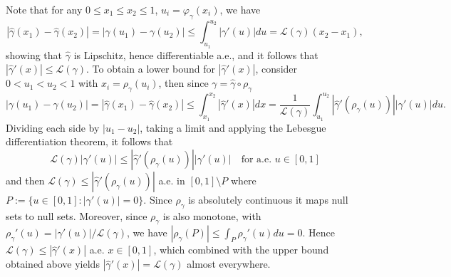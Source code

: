 \documentclass[a4paper,11pt]{amsart}
\theoremstyle{definition}\newtheorem*{definition}{Definition}
\theoremstyle{definition} \newtheorem{proposition}[theorem]{Proposition}
\theoremstyle{definition}\newtheorem{lemma}[theorem]{Lemma}
\theoremstyle{definition}\newtheorem{corollary}[theorem]{Corollary}
\theoremstyle{definition}\newtheorem{example}{Example}
\theoremstyle{remark}\newtheorem*{remark}{Remark}
\newcommand{\abs}[1]{\left | {#1}\right |}
\def\length{\mathcal L}
\begin{document}
Note that for any $0\leq x_1\leq x_2\leq 1$, $u_i=\varphi_\gamma(x_i)$, we have
\begin{equation*}
\abs{\hat\gamma(x_1)-\hat\gamma(x_2)}=\abs{\gamma(u_1)-\gamma(u_2)}\leq \int_{u_1}^{u_2}\abs{\gamma'(u)}du=\length(\gamma)(x_2-x_1),
\end{equation*}
showing that $\hat\gamma$ is Lipschitz, hence differentiable a.e., and it follows that  $\abs{\hat\gamma'(x)}\leq \length(\gamma)$. To obtain a lower bound for $\abs{\hat\gamma'(x)}$, consider $0<u_1<u_2<1$ with $x_i=\rho_\gamma(u_i)$, then since $\gamma=\hat\gamma\circ \rho_\gamma$
\[
\abs{\gamma(u_1)-\gamma(u_2)}=\abs{\hat\gamma(x_1)-\hat\gamma(x_2)}\leq \int_{x_1}^{x_2}\abs{\hat\gamma'(x)}dx=\frac{1}{\length(\gamma)}\int_{u_1}^{u_2}\abs{\hat\gamma'(\rho_\gamma(u))}\abs{\gamma'(u)}du.
\]
Dividing each side by $|u_1-u_2|$, taking a limit and applying the Lebesgue differentiation theorem, it follows that 
\[
\length(\gamma) \abs{\gamma'(u)}\leq \abs{\hat \gamma'(\rho_\gamma(u))}\abs{\gamma'(u)} \quad \text{for a.e. } u\in[0,1]
\]
and then $\length(\gamma) \leq \abs{\hat\gamma'(\rho_\gamma(u))}$ a.e. in $[0,1]\setminus P$ where $P:=\{ u\in [0,1]: |\gamma'(u)|=0\}$. Since $\rho_\gamma$ is absolutely continuous it maps null sets to null sets. Moreover, since $\rho_\gamma$ is also monotone, with  $\rho_\gamma'(u)=\abs{\gamma'(u)}/\length(\gamma)$, we have $|\rho_\gamma(P)|\leq \int_P\rho_\gamma'(u)du=0 $. Hence $\length(\gamma)\leq \abs{\hat\gamma'(x)}$ a.e. $x\in [0,1]$, which combined with the upper bound obtained above yields $\abs{\hat\gamma'(x)}=\length(\gamma)$ almost everywhere.



\end{document}
